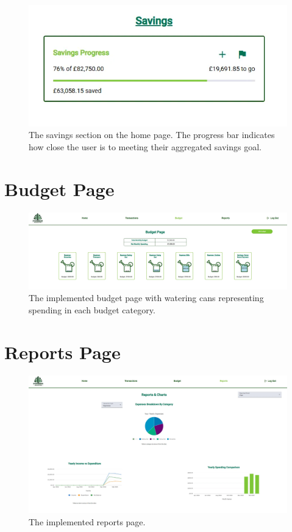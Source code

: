\documentclass{l4proj}
\begin{document}
\begin{appendices}
\begin{figure}[htb]
    \centering
    \includegraphics[width=0.5\linewidth]{images/UI-Screenshots/savings-goals-home.png}
    \caption{The savings section on the home page. The progress bar indicates how close the user is to meeting their aggregated savings goal.}
    \label{fig:savings-goals-home}
\end{figure}

\section{Budget Page}
\begin{figure}[H]
    \centering
    \includegraphics[width=\linewidth]{images/UI-Screenshots/budget-page-fullscreen.png}
    \caption{The implemented budget page with watering cans representing spending in each budget category.}
    \label{fig:reports-page}
\end{figure}

\section{Reports Page}
\begin{figure}[H]
    \centering
    \includegraphics[width=\linewidth]{images/UI-Screenshots/reports-page-fullscreen.png}
    \caption{The implemented reports page.}
    \label{fig:reports-page}
\end{figure}


\end{appendices}
\end{document}

